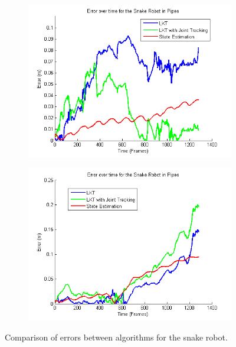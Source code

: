 \documentclass[letterpaper, 10 pt, conference]{ieeeconf}
\begin{document}
\begin{figure}[tb]
	\centering
	\begin{subfigure}{\columnwidth}
		  \centering
		  \includegraphics[width=\columnwidth]{trial8_results.png}
		  \label{snakes:trial8_error}
	\end{subfigure}
	\begin{subfigure}{\columnwidth}
		  \centering
		  \includegraphics[width=\columnwidth]{trial9_results.png}
		  \label{snakes:trial9_error}
	\end{subfigure}
	\caption{Comparison of errors between algorithms for the snake robot.}
    \label{snakes_error}
\end{figure}
\end{document}
